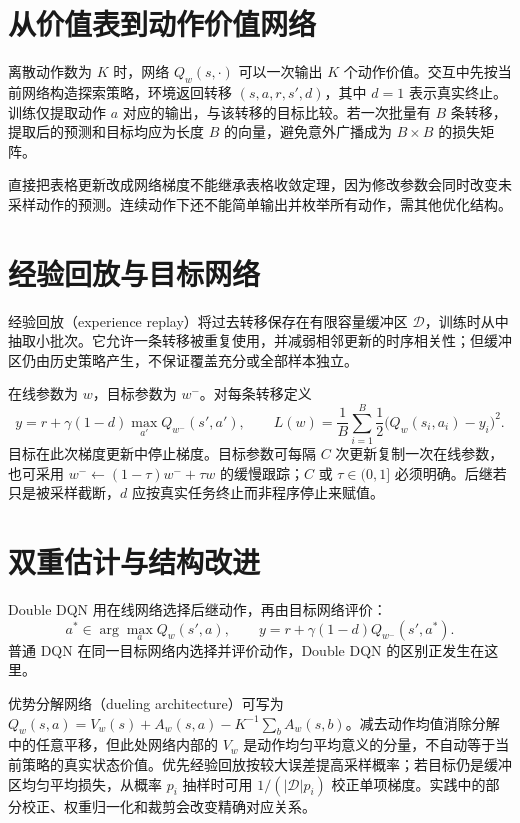 \documentclass[UTF8,12pt,a4paper,fontset=fandol]{ctexbook}
\begin{document}
\section{从价值表到动作价值网络}

离散动作数为 $K$ 时，网络 $Q_w(s,\cdot)$ 可以一次输出 $K$ 个动作价值。交互中先按当前网络构造探索策略，环境返回转移 $(s,a,r,s',d)$，其中 $d=1$ 表示真实终止。训练仅提取动作 $a$ 对应的输出，与该转移的目标比较。若一次批量有 $B$ 条转移，提取后的预测和目标均应为长度 $B$ 的向量，避免意外广播成为 $B\times B$ 的损失矩阵。

直接把表格更新改成网络梯度不能继承表格收敛定理，因为修改参数会同时改变未采样动作的预测。连续动作下还不能简单输出并枚举所有动作，需其他优化结构。

\section{经验回放与目标网络}

经验回放（experience replay）将过去转移保存在有限容量缓冲区 $\mathcal D$，训练时从中抽取小批次。它允许一条转移被重复使用，并减弱相邻更新的时序相关性；但缓冲区仍由历史策略产生，不保证覆盖充分或全部样本独立。

在线参数为 $w$，目标参数为 $w^-$。对每条转移定义
\begin{equation}
y=r+\gamma(1-d)\max_{a'}Q_{w^-}(s',a'),\qquad
L(w)=\frac1B\sum_{i=1}^B\frac12\bigl(Q_w(s_i,a_i)-y_i\bigr)^2.
\label{eq:rl-dqn-loss}
\end{equation}
目标在此次梯度更新中停止梯度。目标参数可每隔 $C$ 次更新复制一次在线参数，也可采用 $w^-\leftarrow(1-\tau)w^-+\tau w$ 的缓慢跟踪；$C$ 或 $\tau\in(0,1]$ 必须明确。后继若只是被采样截断，$d$ 应按真实任务终止而非程序停止来赋值。

\section{双重估计与结构改进}

Double DQN 用在线网络选择后继动作，再由目标网络评价：
\[
a^*\in\arg\max_aQ_w(s',a),\qquad
y=r+\gamma(1-d)Q_{w^-}(s',a^*).
\]
普通 DQN 在同一目标网络内选择并评价动作，Double DQN 的区别正发生在这里。

优势分解网络（dueling architecture）可写为 $Q_w(s,a)=V_w(s)+A_w(s,a)-K^{-1}\sum_bA_w(s,b)$。减去动作均值消除分解中的任意平移，但此处网络内部的 $V_w$ 是动作均匀平均意义的分量，不自动等于当前策略的真实状态价值。优先经验回放按较大误差提高采样概率；若目标仍是缓冲区均匀平均损失，从概率 $p_i$ 抽样时可用 $1/(|\mathcal D|p_i)$ 校正单项梯度。实践中的部分校正、权重归一化和裁剪会改变精确对应关系。
\end{document}
